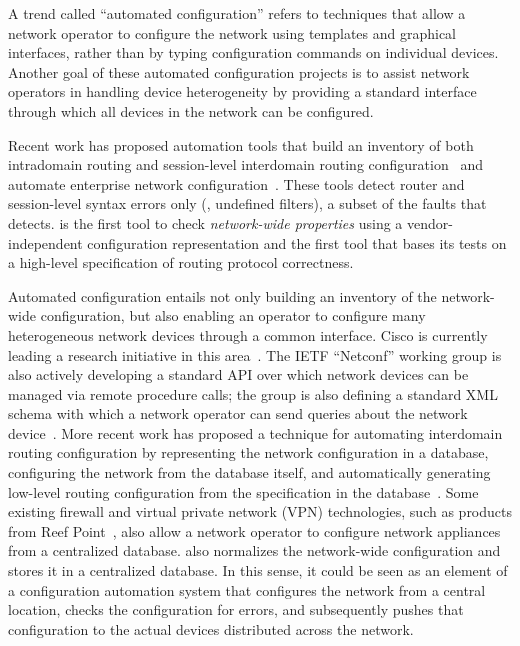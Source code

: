 A trend called ``automated configuration'' refers to techniques that
allow a network operator 
to configure the network using templates and graphical interfaces,
rather than by typing configuration commands on individual devices.
Another goal of these automated configuration projects is to assist
network operators in handling device heterogeneity by providing a
standard interface through which all devices in the network can be
configured.  

Recent work has proposed automation tools that build an inventory of
both intradomain routing and session-level interdomain routing
configuration~\cite{Feldmann2001} and automate enterprise network
configuration~\cite{Caldwell2003}.  These tools detect router and
session-level syntax errors only (\eg, undefined filters), a subset of
the faults that \rcc detects.  \rcc is the first tool to check {\em
network-wide properties} using a vendor-independent configuration
representation and the first tool that bases its tests on a high-level
specification of routing protocol correctness.

Automated configuration entails not only building an inventory of the
network-wide configuration, but also enabling an operator to configure
many heterogeneous network devices through a common interface.
Cisco is currently leading a research initiative in this
area~\cite{www-cisco-comer}. The IETF ``Netconf'' working group is also
actively developing a standard API over which network devices can be
managed via remote procedure calls; the group is also defining a
standard XML schema with which a network operator can send queries about
the network device~\cite{netconf-wg}.
More recent work has
proposed a technique for automating interdomain routing configuration
by representing the network configuration in a database, configuring the
network from the database itself, and automatically generating low-level
routing configuration from the specification in the
database~\cite{Feldmann2005}.  Some existing firewall and virtual
private network (VPN)
technologies, such as products from Reef Point~\cite{www-reefpoint},
also allow a network operator to configure network appliances from a
centralized database.  \rcc also normalizes the network-wide configuration
and stores it in a centralized database.  In this sense, it could be
seen as an element of a configuration automation system that
configures the network from a central location, checks
the configuration for errors, and subsequently pushes that configuration
to the actual devices distributed across the network.


